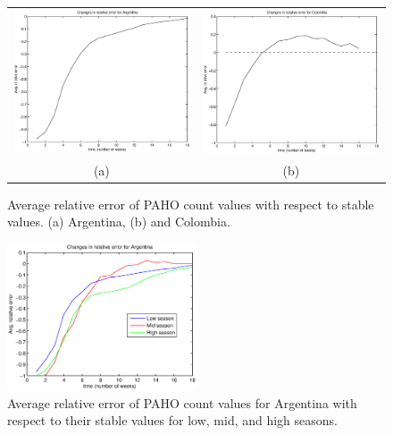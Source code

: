 \begin{figure}[h]
  \centering
   \begin{tabular}{cc}
     \includegraphics[width=.45\textwidth]{fig/forpaper_AVGrelativeALLs_Argentina.eps} &
     \includegraphics[width=.45\textwidth]{fig/forpaper_AVGrelativeALLs_Colombia.eps} \\
      (a) & (b) \\ %
  \end{tabular}
  \caption{Average relative error of PAHO count values with respect to stable values.
  (a) Argentina,
  (b) and Colombia.
  }
  \label{fig:relerrors}

\end{figure}

\begin{figure}[h]
  \centering
    \includegraphics[width=0.5\textwidth]{fig/forpaper_seasonalAVGrelativeALLs_Argentina.eps}
  \caption{Average relative error of PAHO count values for Argentina with respect to their stable values for low, mid, and high seasons.}
  \label{fig:seasonal_relerrors}
\end{figure}  

